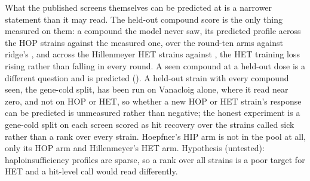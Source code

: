 What the published screens themselves can be predicted at is a narrower statement than it
may read. The held-out compound score is the only thing measured on them: a compound the
model never saw, its predicted profile across the HOP strains against the measured one,
\hydrOneZerosrchoepfnercgt{} over the round-ten arms against ridge's
\hydrOneZerosrchoepfnerridge{}, and across the Hillenmeyer HET strains
\hydrOneZerosrchillenmeyercgt{} against \hydrOneZerosrchillenmeyerridge{}, the HET
training loss rising rather than falling in every round. A seen compound at a held-out
dose is a different question and is predicted (\hydrOneZerosrchoepfnerdose{}). A held-out
strain with every compound seen, the gene-cold split, has been run on Vanacloig alone,
where it read near zero, and not on HOP or HET, so whether a new HOP or HET strain's
response can be predicted is unmeasured rather than negative; the honest experiment is a
gene-cold split on each screen scored as hit recovery over the strains called sick rather
than a rank over every strain. Hoepfner's HIP arm is not in the pool at all, only its HOP
arm and Hillenmeyer's HET arm. Hypothesis (untested): haploinsufficiency profiles are
sparse, so a rank over all strains is a poor target for HET and a hit-level call would
read differently.
